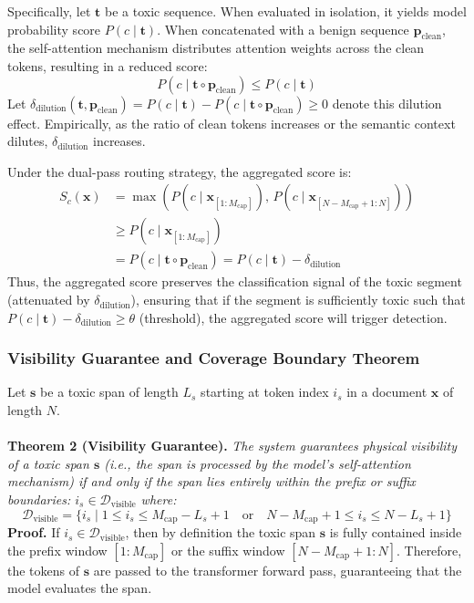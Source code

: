\documentclass[10pt]{article}
\begin{document}
Specifically, let $\mathbf{t}$ be a toxic sequence. When evaluated in isolation, it yields model probability score $P(c \mid \mathbf{t})$. When concatenated with a benign sequence $\mathbf{p}_{\text{clean}}$, the self-attention mechanism distributes attention weights across the clean tokens, resulting in a reduced score:
\begin{equation}
\label{eq:attention_dilution}
P(c \mid \mathbf{t} \circ \mathbf{p}_{\text{clean}}) \le P(c \mid \mathbf{t})
\end{equation}
Let $\delta_{\text{dilution}}(\mathbf{t}, \mathbf{p}_{\text{clean}}) = P(c \mid \mathbf{t}) - P(c \mid \mathbf{t} \circ \mathbf{p}_{\text{clean}}) \ge 0$ denote this dilution effect. Empirically, as the ratio of clean tokens increases or the semantic context dilutes, $\delta_{\text{dilution}}$ increases.

Under the dual-pass routing strategy, the aggregated score is:
\begin{align}
S_c(\mathbf{x}) &= \max\left( P(c \mid \mathbf{x}_{[1:M_{\text{cap}}]}), \, P(c \mid \mathbf{x}_{[N-M_{\text{cap}}+1:N]}) \right) \\
&\ge P(c \mid \mathbf{x}_{[1:M_{\text{cap}}]}) \\
&= P(c \mid \mathbf{t} \circ \mathbf{p}_{\text{clean}}) = P(c \mid \mathbf{t}) - \delta_{\text{dilution}}
\end{align}
Thus, the aggregated score preserves the classification signal of the toxic segment (attenuated by $\delta_{\text{dilution}}$), ensuring that if the segment is sufficiently toxic such that $P(c \mid \mathbf{t}) - \delta_{\text{dilution}} \ge \theta$ (threshold), the aggregated score will trigger detection.

\subsubsection{Visibility Guarantee and Coverage Boundary Theorem}
Let $\mathbf{s}$ be a toxic span of length $L_s$ starting at token index $i_s$ in a document $\mathbf{x}$ of length $N$.
\\
\\
\textbf{Theorem 2 (Visibility Guarantee).} \textit{The system guarantees physical visibility of a toxic span $\mathbf{s}$ (i.e., the span is processed by the model's self-attention mechanism) if and only if the span lies entirely within the prefix or suffix boundaries: $i_s \in \mathcal{D}_{\text{visible}}$ where:
\begin{equation}
\label{eq:visible_domain}
\mathcal{D}_{\text{visible}} = \{ i_s \mid 1 \le i_s \le M_{\text{cap}} - L_s + 1 \quad \text{or} \quad N - M_{\text{cap}} + 1 \le i_s \le N - L_s + 1 \}
\end{equation}
}
\textbf{Proof.}
If $i_s \in \mathcal{D}_{\text{visible}}$, then by definition the toxic span $\mathbf{s}$ is fully contained inside the prefix window $[1:M_{\text{cap}}]$ or the suffix window $[N - M_{\text{cap}} + 1 : N]$. Therefore, the tokens of $\mathbf{s}$ are passed to the transformer forward pass, guaranteeing that the model evaluates the span.
\end{document}
